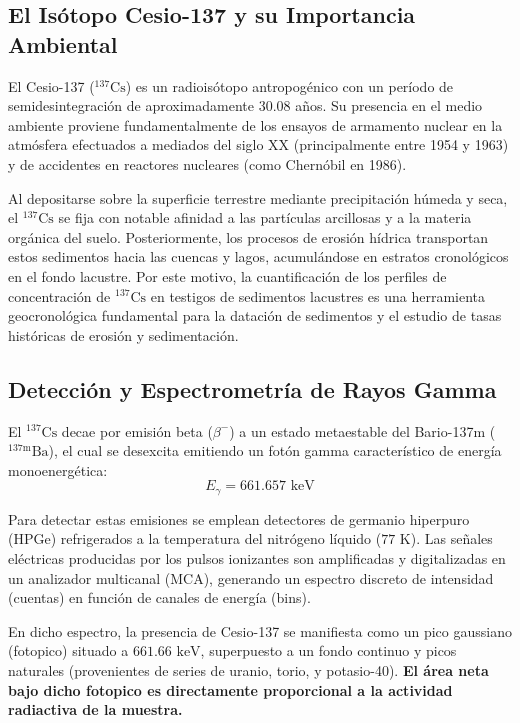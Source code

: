 \documentclass[11pt,a4paper]{article}
\begin{document}
\subsection{El Isótopo Cesio-137 y su Importancia Ambiental}
El Cesio-137 ($^{137}\text{Cs}$) es un radioisótopo antropogénico con un período de semidesintegración de aproximadamente $30.08$ años. Su presencia en el medio ambiente proviene fundamentalmente de los ensayos de armamento nuclear en la atmósfera efectuados a mediados del siglo XX (principalmente entre 1954 y 1963) y de accidentes en reactores nucleares (como Chernóbil en 1986). 

Al depositarse sobre la superficie terrestre mediante precipitación húmeda y seca, el $^{137}\text{Cs}$ se fija con notable afinidad a las partículas arcillosas y a la materia orgánica del suelo. Posteriormente, los procesos de erosión hídrica transportan estos sedimentos hacia las cuencas y lagos, acumulándose en estratos cronológicos en el fondo lacustre. Por este motivo, la cuantificación de los perfiles de concentración de $^{137}\text{Cs}$ en testigos de sedimentos lacustres es una herramienta geocronológica fundamental para la datación de sedimentos y el estudio de tasas históricas de erosión y sedimentación.

\subsection{Detección y Espectrometría de Rayos Gamma}
El $^{137}\text{Cs}$ decae por emisión beta ($\beta^-$) a un estado metaestable del Bario-137m ($^{137\text{m}}\text{Ba}$), el cual se desexcita emitiendo un fotón gamma característico de energía monoenergética:
\begin{equation}
E_\gamma = 661.657 \text{ keV}
\end{equation}

Para detectar estas emisiones se emplean detectores de germanio hiperpuro (HPGe) refrigerados a la temperatura del nitrógeno líquido ($77\text{ K}$). Las señales eléctricas producidas por los pulsos ionizantes son amplificadas y digitalizadas en un analizador multicanal (MCA), generando un espectro discreto de intensidad (cuentas) en función de canales de energía (bins).

En dicho espectro, la presencia de Cesio-137 se manifiesta como un pico gaussiano (fotopico) situado a $661.66\text{ keV}$, superpuesto a un fondo continuo y picos naturales (provenientes de series de uranio, torio, y potasio-40). \textbf{El área neta bajo dicho fotopico es directamente proporcional a la actividad radiactiva de la muestra.}
\end{document}
